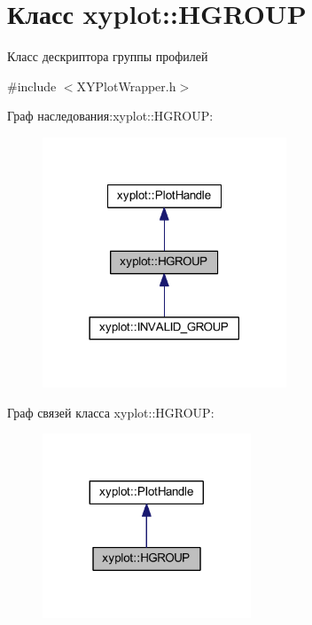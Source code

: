 \hypertarget{classxyplot_1_1_h_g_r_o_u_p}{\section{Класс xyplot\-:\-:H\-G\-R\-O\-U\-P}
\label{classxyplot_1_1_h_g_r_o_u_p}
}


Класс дескриптора группы профилей  




{\ttfamily \#include $<$X\-Y\-Plot\-Wrapper.\-h$>$}



Граф наследования\-:xyplot\-:\-:H\-G\-R\-O\-U\-P\-:\nopagebreak
\begin{figure}[H]
\begin{center}
\leavevmode
\includegraphics[width=206pt]{classxyplot_1_1_h_g_r_o_u_p__inherit__graph}
\end{center}
\end{figure}


Граф связей класса xyplot\-:\-:H\-G\-R\-O\-U\-P\-:\nopagebreak
\begin{figure}[H]
\begin{center}
\leavevmode
\includegraphics[width=176pt]{classxyplot_1_1_h_g_r_o_u_p__coll__graph}
\end{center}
\end{figure}

